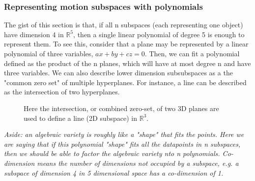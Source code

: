 \subsubsection{Representing motion subspaces with polynomials}

 The gist of this section is that, if all n subspaces (each representing one object) have dimension 4 in $\mathbb{R}^5$, then a single linear
 polynomial of degree 5 is enough to represent them. To see this, consider that a plane may be represented by a linear polynomial of three variables,
 $ax+by+cz = 0$. Then, we can fit a polynomial defined as the product of the n planes, which will have at most degree n and have three variables. We
 can also describe lower dimension subsubspaces as a the "common zero set" of multiple hyperplanes. For instance, a line can be described as the
 intersection of two hyperplanes. 

 \begin{figure} \centering
     \caption{Here the intersection, or combined zero-set, of two 3D planes are used to define a line (2D subspace) in $\mathbb{R}^3$.} \end{figure}

 \textit{Aside: an algebraic variety is roughly like a "shape" that fits the points. Here we are saying that if this polynomial "shape" fits all the
 datapoints in n subspaces, then we should be able to factor the algebraic variety nto n polynomials.  Co-dimension means the number of dimensions not
 occupied by a subspace, e.g. a subspace of dimension 4 in 5 dimensional space has a co-dimension of 1. }
